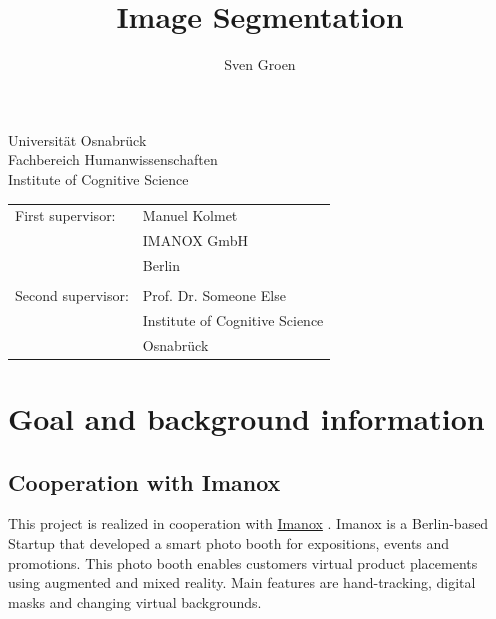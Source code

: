 \documentclass[11pt,
  paper=a4, 
  bibliography=totocnumbered,
	captions=tableheading,
	BCOR=10mm
]{scrreprt}
\title{Image Segmentation}
\author{Sven Groen}
\theoremstyle{definition}
\begin{document}
\begin{titlepage}
	\begin{flushleft}
		Universität Osnabrück\\
		Fachbereich Humanwissenschaften\\
		Institute of Cognitive Science
	\end{flushleft}

	\vspace{2cm}
	\vspace{1cm}

	\begin{tabular}{ll}
		First supervisor:  & Manuel Kolmet          \\
		                   & IMANOX GmbH             \\
		                   & Berlin                   \\\\
		Second supervisor: & Prof. Dr. Someone Else         \\
		                   & Institute of Cognitive Science \\
		                   & Osnabrück
	\end{tabular}

\end{titlepage}


\pagebreak


\tableofcontents
\listoffigures
\listoftables
\listofalgorithms


\chapter{Goal and background information}

\section{Cooperation with Imanox}
This project is realized in cooperation with \href{https://www.imanox.de/}{Imanox} . 
Imanox is a Berlin-based Startup that developed a smart photo booth for expositions, events and promotions. 
This photo booth enables customers virtual product placements using augmented and mixed reality. 
Main features are hand-tracking, digital masks and changing virtual backgrounds.
\end{document}
